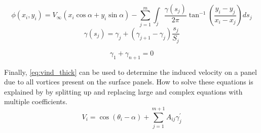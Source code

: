 \begin{equation}
  \label{eq:phi_thick}
    \phi\left(x_{i}, y_{i}\right)=V_{\infty}\left(x_{i} \cos \alpha+y_{i} \sin \alpha\right)-\sum_{j=1}^{m} \int_{j} \frac{\gamma\left(s_{j}\right)}{2 \pi} \tan ^{-1}\left(\frac{y_{i}-y_{j}}{x_{i}-x_{j}}\right) d s_{j}
  \end{equation}
  \begin{equation}
    \gamma\left(s_{j}\right)=\gamma_{j}+\left(\gamma_{j+1}-\gamma_{j}\right) \frac{s_{j}}{S_{j}}
    \end{equation}
\medskip



\begin{equation}
  \label{eq:kutta2}
      \gamma_1 + \gamma_{n+1} = 0
\end{equation}

Finally, \cref{eq:vind_thick} can be used to determine the induced velocity on a
panel due to all vortices present on the surface panels. How to solve these
equations is explained by \citeauthor{kuethe_chow_1998}\cite{kuethe_chow_1998}
by splitting up and replacing large and complex equations with multiple coefficients.
\begin{equation}
  \label{eq:vind_thick}
  V_{i}=\cos \left(\theta_{i}-\alpha\right)+\sum_{j=1}^{m+1} A_{i j} \gamma_{j}^{\prime}
  \end{equation}


